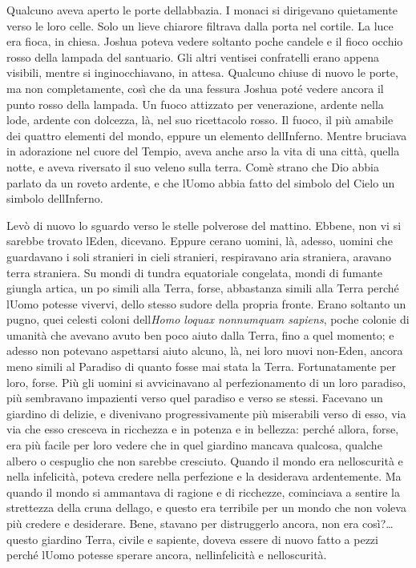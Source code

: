 Qualcuno aveva aperto le porte dell\textquotesingle abbazia. I monaci si
dirigevano quietamente verso le loro celle. Solo un lieve chiarore
filtrava dalla porta nel cortile. La luce era fioca, in chiesa. Joshua
poteva vedere soltanto poche candele e il fioco occhio rosso della
lampada del santuario. Gli altri ventisei confratelli erano appena
visibili, mentre si inginocchiavano, in attesa. Qualcuno chiuse di nuovo
le porte, ma non completamente, così che da una fessura Joshua poté
vedere ancora il punto rosso della lampada. Un fuoco attizzato per
venerazione, ardente nella lode, ardente con dolcezza, là, nel suo
ricettacolo rosso. Il fuoco, il più amabile dei quattro elementi del
mondo, eppure un elemento dell\textquotesingle Inferno. Mentre bruciava
in adorazione nel cuore del Tempio, aveva anche arso la vita di una
città, quella notte, e aveva riversato il suo veleno sulla terra.
Com\textquotesingle è strano che Dio abbia parlato da un roveto ardente,
e che l\textquotesingle Uomo abbia fatto del simbolo del Cielo un
simbolo dell\textquotesingle Inferno.

Levò di nuovo lo sguardo verso le stelle polverose del mattino. Ebbene,
non vi si sarebbe trovato l\textquotesingle Eden, dicevano. Eppure
c\textquotesingle erano uomini, là, adesso, uomini che guardavano i soli
stranieri in cieli stranieri, respiravano aria straniera, aravano terra
straniera. Su mondi di tundra equatoriale congelata, mondi di fumante
giungla artica, un po\textquotesingle{} simili alla Terra, forse,
abbastanza simili alla Terra perché l\textquotesingle Uomo potesse
vivervi, dello stesso sudore della propria fronte. Erano soltanto un
pugno, quei celesti coloni dell\textquotesingle{}\emph{Homo loquax
	nonnumquam sapiens}, poche colonie di umanità che avevano avuto ben poco
aiuto dalla Terra, fino a quel momento; e adesso non potevano aspettarsi
aiuto alcuno, là, nei loro nuovi non-Eden, ancora meno simili al
Paradiso di quanto fosse mai stata la Terra. Fortunatamente per loro,
forse. Più gli uomini si avvicinavano al perfezionamento di un loro
paradiso, più sembravano impazienti verso quel paradiso e verso se
stessi. Facevano un giardino di delizie, e divenivano progressivamente
più miserabili verso di esso, via via che esso cresceva in ricchezza e
in potenza e in bellezza: perché allora, forse, era più facile per loro
vedere che in quel giardino mancava qualcosa, qualche albero o cespuglio
che non sarebbe cresciuto. Quando il mondo era
nell\textquotesingle oscurità e nella infelicità, poteva credere nella
perfezione e la desiderava ardentemente. Ma quando il mondo si ammantava
di ragione e di ricchezze, cominciava a sentire la strettezza della
cruna dell\textquotesingle ago, e questo era terribile per un mondo che
non voleva più credere e desiderare. Bene, stavano per distruggerlo
ancora, non era così?\ldots{} questo giardino Terra, civile e sapiente,
doveva essere di nuovo fatto a pezzi perché l\textquotesingle Uomo
potesse sperare ancora, nell\textquotesingle infelicità e
nell\textquotesingle oscurità.

